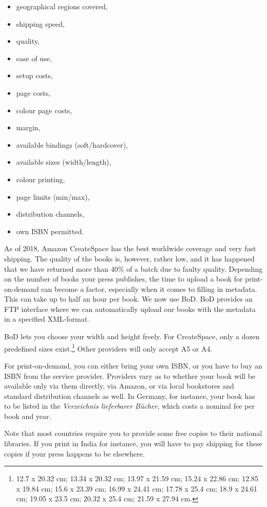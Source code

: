 \documentclass[nonflat,modfonts,output=book] {langsci/langscibook}
\begin{document}
\begin{itemize}
 \item geographical regions covered, 
 \item shipping speed,
 \item quality,
 \item ease of use, 
 \item setup costs, 
 \item page costs, 
 \item colour page costs, 
 \item margin,
 \item available bindings (soft/hardcover), 
 \item available sizes (width/length), 
 \item colour printing, 
 \item page limits (min/max),
 \item distribution channels,
 \item own ISBN permitted.
\end{itemize}

As of 2018, Amazon CreateSpace has the best worldwide coverage and very fast shipping. The quality of the books is, however, rather low, and it has happened that we have returned more than 40\% of a batch due to faulty quality. Depending on the number of books your press publishes, the time to upload a book for print-on-demand can become a factor, especially when it comes to filling in metadata. This can take up to half  an hour per book. We now use BoD. BoD provides an FTP interface where we can automatically upload our books with the metadata in a specified XML-format. 

BoD lets you choose your width and height freely. For CreateSpace, only a dozen  
 predefined sizes exist.\footnote{%
12.7 x 20.32  cm; 
13.34 x 20.32 cm;
13.97 x 21.59 cm;
15.24 x 22.86 cm;
12.85 x 19.84 cm;
15.6 x 23.39  cm;
16.99 x 24.41 cm;
17.78 x 25.4  cm;
18.9 x 24.61  cm;
19.05 x 23.5  cm;
20.32 x 25.4  cm;
21.59 x 27.94 cm.} Other providers will only accept A5 or A4. 

For print-on-demand, you can either bring your own ISBN, or you have to buy an ISBN from the service provider. Providers vary as to whether your book will be available only via them directly, via Amazon, or via local bookstores and standard distribution channels as well. In Germany, for instance, your book has to be listed in the \textit{Verzeichnis lieferbarer Bücher}, which costs a nominal fee per book and year.

Note that most countries require you to provide some free copies to their national libraries. If you print in India for instance, you will have to pay shipping for these copies if your press happens to be elsewhere.
\end{document}
